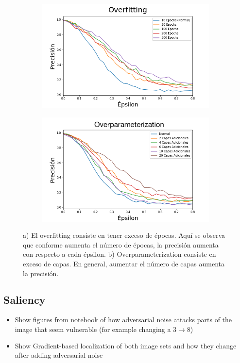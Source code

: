 \begin{figure}[h]
    \centering
    \begin{subfigure}[b]{0.49\textwidth}
        \centering
        \includegraphics[width=\textwidth]{images/overfit_vs_attack.png}
        \caption{}
        \label{overfit}
    \end{subfigure}
    \begin{subfigure}[b]{0.49\textwidth}
        \centering
        \includegraphics[width=\textwidth]{images/overparam_vs_attack.png}
        \caption{}
        \label{overparam}
    \end{subfigure}
    \caption{ a) El overfitting consiste en tener exceso de épocas. Aquí se observa que conforme aumenta el número de épocas, la precisión aumenta con respecto a cada épsilon. b) Overparameterization consiste en exceso de capas. En general, aumentar el número de capas aumenta la precisión.}
    \label{overaparam_overfit}
\end{figure}

\pagebreak
    
\subsection{Saliency}
\begin{itemize}
    \item Show figures from notebook of how adversarial noise attacks parts of the image that seem vulnerable (for example changing a 3$\to$8)
    \item Show Gradient-based localization of both image sets and how they change after adding adversarial noise\cite{Selvaraju_2019}
\end{itemize}
